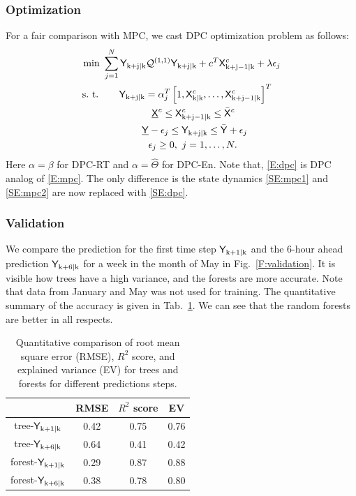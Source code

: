\subsubsection{Optimization} 
\label{SSS:dpc_opt}
For a fair comparison with MPC, we cast DPC optimization problem as follows:
\begin{subequations}
\begin{align}
\text{min } & \sum_{j=1}^{N} {\mathsf{Y}}_{\mathrm{k+j|k}} \mathcal{Q}^{(1,1)} {\mathsf{Y}}_{\mathrm{k+j|k}} + c^T \mathsf{X}^c_{\mathrm{k+j-1|k}}+  \lambda\epsilon_j\\
\text{s.~t. } & \ \ \ \ \ \mathsf{Y}_{\mathrm{k+j|k}} =  \alpha_j^T \left[1,\mathsf{X}^c_{\mathrm{k|k}},\dots,\mathsf{X}^c_{\mathrm{k+j-1|k}} \right]^T \label{SE:dpc}\\
& \ \ \ \ \ \ \ \ \ \ \ \ \ \ \ \underline{\mathsf{X}}^c \leq \mathsf{X}^c_{\mathrm{k+j-1|k}} \leq \bar{\mathsf{X}}^c\\ 
& \ \ \ \ \ \ \ \ \ \ \ \ \underline{\mathsf{Y}}-\epsilon_j \leq \mathsf{Y}_{\mathrm{k+j|k}} \leq \bar{\mathsf{Y}} + \epsilon_j\\\
& \ \ \ \ \ \ \ \ \ \ \ \ \ \ \epsilon_j \geq 0, \ j = 1,\dots,N.
\end{align} \label{E:dpc}
\end{subequations}
\noindent Here $\alpha = \beta$ for DPC-RT and $\alpha = \hat{\Theta}$ for DPC-En.
Note that, \eqref{E:dpc} is DPC analog of \eqref{E:mpc}. The only difference is the state dynamics \eqref{SE:mpc1} and \eqref{SE:mpc2} are now replaced with \eqref{SE:dpc}.

\subsubsection{Validation} 
\label{SSS:dpc_val}

We compare the prediction for the first time step $\mathsf{Y}_{\mathrm{k+1|k}}$ and the 6-hour ahead prediction $\mathsf{Y}_{\mathrm{k+6|k}}$ for a week in the month of May in Fig.~\ref{F:validation}. It is visible how trees have a high variance, and the forests are more accurate. Note that data from January and May was not used for training. The quantitative summary of the accuracy is given in Tab.~\ref{T:validation}. We can see that the random forests are better in all respects.
\begin{table}[h!]
	\centering
	\begin{tabular}{cccc}
		\toprule
		& RMSE & $R^2$ score & EV  \\ 
		\midrule
		tree-$\mathsf{Y}_{\mathrm{k+1|k}}$    &  0.42 &  0.75 & 0.76    \\
		tree-$\mathsf{Y}_{\mathrm{k+6|k}}$  & 0.64 &  0.41  & 0.42 \\
		forest-$\mathsf{Y}_{\mathrm{k+1|k}}$  & 0.29 & 0.87  & 0.88 \\
		forest-$\mathsf{Y}_{\mathrm{k+6|k}}$  & 0.38 & 0.78 & 0.80 \\
		\bottomrule
	\end{tabular}
	\caption{Quantitative comparison of root mean square error (RMSE), $R^2$ score, and explained variance (EV) for trees and forests for different predictions steps.}
	\captionsetup{justification=centering}
	\label{T:validation}
\end{table}

